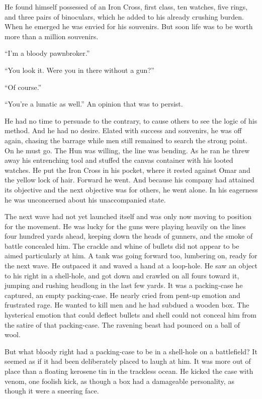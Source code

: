 He found himself possessed of an Iron Cross, first class, ten watches, five rings, and three pairs of binoculars, which he added to his already crushing burden. When he emerged he was envied for his souvenirs. But soon life was to be worth more than a million souvenirs.

``I'm a bloody pawnbroker.''

``You look it. Were you in there without a gun?''

``Of course.''

``You're a lunatic as well.'' An opinion that was to persist.

He had no time to persuade to the contrary, to cause others to see the logic of his method. And he had no desire. Elated with success and souvenirs, he was off again, chasing the barrage while men still remained to search the strong point. On he must go. The Hun was willing, the line was bending. As he ran he threw away his entrenching tool and stuffed the canvas container with his looted watches. He put the Iron Cross in his pocket, where it rested against Omar and the yellow lock of hair. Forward he went. And because his company had attained its objective and the next objective was for others, he went alone. In his eagerness he was unconcerned about his unaccompanied state.

The next wave had not yet launched itself and was only now moving to position for the movement. He was lucky for the guns were playing heavily on the lines four hundred yards ahead, keeping down the heads of gunners, and the smoke of battle concealed him. The crackle and whine of bullets did not appear to be aimed particularly at him. A tank was going forward too, lumbering on, ready for the next wave. He outpaced it and waved a hand at a loop-hole. He saw an object to his right in a shell-hole, and got down and crawled on all fours toward it, jumping and rushing headlong in the last few yards. It was a packing-case he captured, an empty packing-case. He nearly cried from pent-up emotion and frustrated rage. He wanted to kill men and he had subdued a wooden box. The hysterical emotion that could deflect bullets and shell could not conceal him from the satire of that packing-case. The ravening beast had pounced on a ball of wool.

But what bloody right had a packing-case to be in a shell-hole on a battlefield? It seemed as if it had been deliberately placed to laugh at him. It was more out of place than a floating kerosene tin in the trackless ocean. He kicked the case with venom, one foolish kick, as though a box had a damageable personality, as though it were a sneering face.

